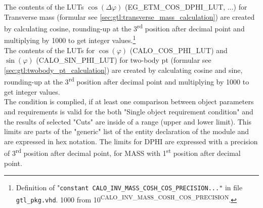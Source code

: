 The contents of the LUTs $\cos(\Delta\varphi)$ (\small{EG\_ETM\_COS\_DPHI\_LUT}\normalsize, ...) for Transverse mass (formular see \ref{sec:gtl:transverse_mass_calculation}) 
are created by calculating cosine, rounding-up at the 3\textsuperscript{rd}
position after decimal point and multiplying by 1000 to get integer values.\footnote{Definition of "\texttt{constant \small{CALO\_INV\_MASS\_COSH\_COS\_PRECISION}\normalsize ..."} in file \texttt{gtl\_pkg.vhd}.
1000 from 10\textsuperscript{\tiny{CALO\_INV\_MASS\_COSH\_COS\_PRECISION}}\normalsize.}\\
The contents of the LUTs for $\cos(\varphi)$ (\small{CALO\_COS\_PHI\_LUT}\normalsize) and $\sin(\varphi)$ (\small{CALO\_SIN\_PHI\_LUT}\normalsize) for two-body pt 
(formular see \ref{sec:gtl:twobody_pt_calculation}) are created by calculating cosine and sine, rounding-up at the 3\textsuperscript{rd} position after decimal point and multiplying by 1000 to get integer values.\\
The condition is complied, if at least one comparison between object parameters and requirements is valid for the both "Single object requirement condition"
and the results of selected "Cuts" are inside of a range (upper and lower limit).
This limits are parts of the "generic" list of the entity declaration of the module and are expressed in hex notation. The limits for DPHI
are expressed with a precision of 3\textsuperscript{rd} position after decimal point, for MASS with 1\textsuperscript{st} position after decimal point.

